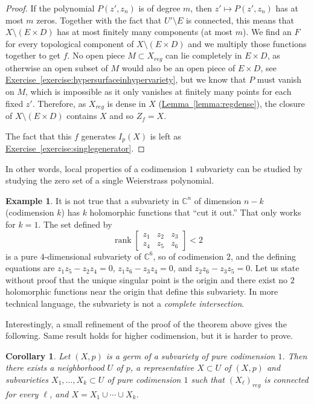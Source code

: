 \documentclass[12pt,openany]{book}
\newcommand{\C}{{\mathbb{C}}}
\newcommand{\rank}{\operatorname{rank}}
\newcommand{\myindex}[1]{#1\index{#1}}
\theoremstyle{plain}
\newtheorem{cor}[thm]{Corollary}
\theoremstyle{remark}
\theoremstyle{definition}
\theoremstyle{exercise}
\theoremstyle{example}
\newtheorem{example}[thm]{Example}
\newcommand{\exerciseref}[1]{\hyperref[#1]{Exercise~\ref*{#1}}}
\newcommand{\lemmaref}[1]{\hyperref[#1]{Lemma~\ref*{#1}}}
\begin{document}
\begin{proof}
If the polynomial $P(z',z_n)$ is of degree $m$,
then $z' \mapsto P(z',z_n)$ has at most $m$ zeros.  Together with
the fact that $U' \setminus E$ is connected, this means that
$X \setminus (E \times D)$ has at most finitely many components (at
most $m$).
We find an $F$ for every topological component of $X \setminus ( E \times D )$
and we multiply those functions together to get $f$.
No open piece $M \subset X_{\mathit{reg}}$ can lie completely in $E \times D$,
as otherwise an open subset of $M$ would also be an open piece of $E \times D$,
see \exerciseref{exercise:hypersurfaceinhypervariety},
but we know that $P$ must vanish on $M$, which is impossible as
it only vanishes at finitely
many points for each fixed $z'$.
Therefore, as $X_{\mathit{reg}}$ is dense in $X$ (\lemmaref{lemma:regdense}),
the closure of $X \setminus (E \times D)$ contains $X$ and so $Z_f = X$.

The fact that this $f$ generates $I_p(X)$ is left as
\exerciseref{exercise:singlegenerator}.
\end{proof}

In other words, local properties of a codimension $1$ subvariety can be
studied by studying the zero set of a single Weierstrass polynomial.

\begin{example}
It is not true that
a subvariety in $\C^n$ of dimension $n-k$ (codimension $k$)
has $k$
holomorphic functions that ``cut it out.''  That only works for $k=1$.
The set defined by
\begin{equation*}
\rank
\begin{bmatrix}
z_1 & z_2 & z_3 \\
z_4 & z_5 & z_6
\end{bmatrix}
< 2
\end{equation*}
is a pure $4$-dimensional subvariety of $\C^6$, so of codimension $2$,
and the defining equations are
$z_1z_5-z_2z_4 = 0$,
$z_1z_6-z_3z_4 = 0$, and
$z_2z_6-z_3z_5 = 0$.  Let us state without proof that the unique singular point is the origin and there exist
no $2$ holomorphic functions near the origin
that define this subvariety.  In more technical
language, the subvariety is not a \emph{\myindex{complete intersection}}.
\end{example}

Interestingly, a small refinement of the proof of the theorem above gives
the following.
Same result holds
for higher codimension, but it is harder to prove.

\begin{cor}
Let $(X,p)$ is a germ of a subvariety of pure codimension $1$.  Then there exists
a neighborhood $U$ of $p$, a representative $X \subset U$ of $(X,p)$
and subvarieties $X_1,\ldots,X_k \subset U$
of pure codimension $1$ such that $(X_\ell)_{\mathit{reg}}$ is connected for
every $\ell$, and
$X = X_1 \cup \cdots \cup X_k$.
\end{cor}
\end{document}
